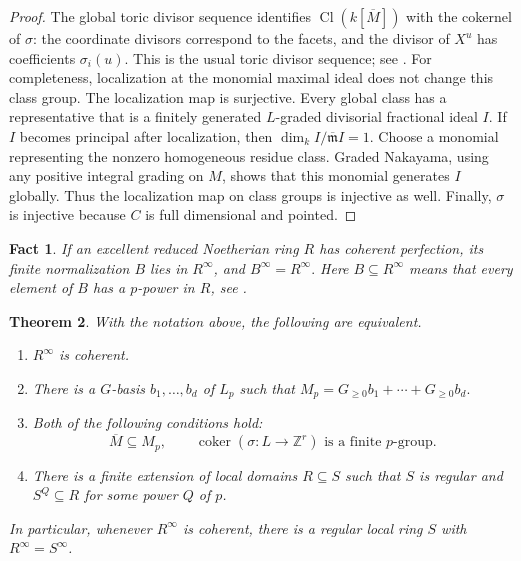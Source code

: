 \documentclass[11pt,a4paper]{amsart}
\numberwithin{equation}{section}
\newtheorem{theorem}{Theorem}[section]
\newtheorem{fact}[theorem]{Fact}\newtheorem{claim}[theorem]{Claim}
\newcommand{\Cl}{\operatorname{Cl}}
\newcommand{\ZZ}{\mathbb Z}
\begin{document}
 \begin{proof}	The global toric divisor sequence identifies	$\Cl(k[\overline M])$ with the cokernel of $\sigma$:	the coordinate divisors correspond to the facets, and the divisor of	$X^u$ has coefficients $\sigma_i(u)$. This is the usual toric 	divisor sequence; see \cite[Theorem~4.1.3]{CLS}. For completeness, localization at the monomial maximal ideal does	not change this class group. The localization map is surjective. 	Every global class has a representative that is a finitely generated
 $L$-graded divisorial fractional ideal $I$. If $I$ becomes
principal after localization, then
$	\dim_k I/\overline{\mathfrak m}I=1.$	Choose a monomial representing the nonzero homogeneous residue class.	Graded Nakayama, using any positive integral grading on $M$,	shows that this monomial generates $I$ globally.	Thus the localization map on class groups is injective as well.	Finally, $\sigma$ is injective because $C$ is full dimensional and	pointed.
 \end{proof}
 \begin{fact} If an excellent reduced Noetherian ring \(R\) has coherent
 perfection, its finite normalization \(B\) lies in \(R^\infty\), and
$B^\infty=R^\infty.$
 Here \(B\subseteq R^\infty\) means that every element of \(B\) has a
 \(p\)-power in \(R\), see \cite[3.8]{Shim}.\end{fact}
 \begin{theorem}\label{thm:toric}	With the notation above, the following are equivalent.	\begin{enumerate}	\item $R^\infty$ is coherent.		\item There is a $G$-basis $b_1,\ldots,b_d$ of $L_p$ such that	$	M_p=G_{\geq0}b_1+\cdots+G_{\geq0}b_d.$		\item Both of the following conditions hold:		$$ 		\overline M\subseteq M_p,		\qquad		\operatorname{coker}(\sigma:L\longrightarrow\ZZ^r)		\text{ is a finite }p\text{-group}.	 	$$		\item There is a finite extension of local domains $R\subseteq S$		such that $S$ is regular and $S^Q\subseteq R$ for some power		$Q$ of $p$.
 	\end{enumerate}	In particular, whenever $R^\infty$ is coherent, there  is a regular	local ring $S$ with $R^\infty=S^\infty$. 
 \end{theorem}
 
\end{document}
